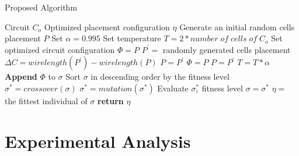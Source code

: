 \documentclass[conference]{IEEEtran}
\begin{document}
\begin{algorithm}[H]
    \caption{Proposed Algorithm}
    \begin{algorithmic}[1]
    \renewcommand{\algorithmicrequire}{\textbf{Input:}}
    \renewcommand{\algorithmicensure}{\textbf{Output:}}
    \Require Circuit $C_{o}$
    \Ensure  Optimized placement configuration $\eta$
    \State Generate an initial random cells placement $P$
        \State Set $\alpha = 0.995$
        \State Set temperature $T = 2 * number\; of\; cells\; of\; C_{o}$
        \State Set optimized circuit configuration $\Phi = P$
        \State $P^{'} = $ randomly generated cells placement
        \State $\Delta C = wirelength(P^{'}) - wirelength(P)$
            \State $P = P^{'}$
                \State $\Phi = P$
            \EndIf
            \State $P = P^{'}$
        \EndIf
        \State $T = T * \alpha$
        \EndWhile
        \State \textbf{Append} $\Phi$ to $\sigma$
    \EndWhile
        \State Sort $\sigma$ in descending order by the fitness level
        \State $\sigma^{*} = crossover(\sigma)$
        \State $\sigma^{*} = mutation(\sigma^{*})$
        \algrenewcommand{}
            \State Evaluate $\sigma^{*}_{i}$ fitness level
        \EndFor
        \State $\sigma = \sigma^{*}$
    \EndWhile
    \State $\eta = $ the fittest individual of $\sigma$
    \State \textbf{return} $\eta$
    \end{algorithmic} 
\end{algorithm}


\section{Experimental Analysis}

\end{document}
